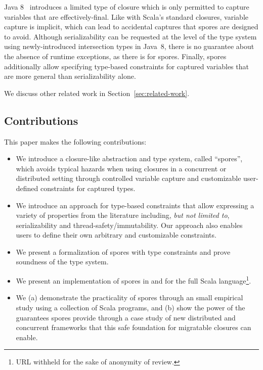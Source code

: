 \documentclass{llncs}
\newcommand{\sporeurl}{URL withheld for the sake of anonymity of review.}
\begin{document}
{Java 8}~\cite{JavaLambdas,JavaLambdaTranslation} introduces a limited type of
closure which is only permitted to capture variables that are
effectively-final. Like with Scala's standard closures, variable capture is
implicit, which can lead to accidental captures that spores are designed to
avoid. Although serializability can be requested at the level of the type
system using newly-introduced intersection types in \mbox{Java 8}, there is no
guarantee about the absence of runtime exceptions, as there is for spores.
Finally, spores additionally allow specifying type-based constraints for
captured variables that are more general than serializability alone.

We discuss other related work in Section~\ref{sec:related-work}.

\subsection{Contributions}

This paper makes the following contributions:
\begin{itemize}
\item We introduce a closure-like abstraction and type system,  called
``spores'', which avoids typical hazards when using closures in a concurrent
or distributed setting through controlled variable capture and customizable
user-defined constraints for captured types.

\item We introduce an approach for type-based constraints that allow
expressing  a variety of properties from the literature including, {\em but
not limited to}, serializability and thread-safety/immutability. Our approach
also enables users to define their own arbitrary and customizable constraints.

\item We present a formalization of spores with type constraints and  prove
soundness of the type system.

\item We present an implementation of spores in and for the full Scala
language\footnote{\sporeurl}.

\item We (a) demonstrate the practicality of spores through an small
empirical study using a collection of Scala programs, and (b) show the power
of the guarantees spores provide through a case study of new distributed and
concurrent frameworks that this safe foundation for migratable closures can
enable.
\end{itemize}
\end{document}
